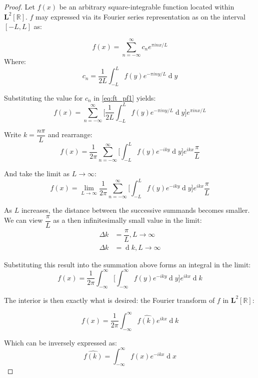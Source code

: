 \documentclass[12pt,a4paper]{report}
\DeclareMathOperator{\deriv}{d}
\theoremstyle{thms}
\theoremstyle{defns}
\begin{document}
\begin{proof}
    Let $f(x)$ be an arbitrary square-integrable function located within $\mathbf{L}^2[\mathbb{R}]$. $f$ may expressed via its Fourier series representation as on the interval $[-L, L]$ as:

    \begin{equation}
        f(x) = \sum_{n=-\infty}^{\infty} c_ne^{\pi inx/L}
        \label{eq:ft_pf1}
    \end{equation}
    Where:
    \begin{equation}
        c_n = \dfrac{1}{2L}\int_{-L}^{L} f(y)e^{-\pi iny/L}\deriv{y}
    \end{equation}

    Substituting the value for $c_n$ in \eqref{eq:ft_pf1} yields:
    \begin{equation}
        f(x) = \sum_{n=-\infty}^{\infty} \Big[\dfrac{1}{2L}\int_{-L}^{L} f(y)e^{-\pi iny/L}\deriv{y}\Big]e^{\pi inx/L}
    \end{equation}

    Write $k = \dfrac{n\pi}{L}$ and rearrange:
    \begin{equation}
        f(x) = \dfrac{1}{2\pi}\sum_{n=-\infty}^{\infty} \Big[\int_{-L}^{L} f(y)e^{-iky}\deriv{y}\Big]e^{ikx}\dfrac{\pi}{L}
    \end{equation}

    And take the limit as $L \to \infty$:
    \begin{equation}
        f(x) = \lim_{L\to\infty}\dfrac{1}{2\pi}\sum_{n=-\infty}^{\infty} \Big[\int_{-L}^{L} f(y)e^{-iky}\deriv{y}\Big]e^{ikx}\dfrac{\pi}{L}
    \end{equation}

    As $L$ increases, the distance between the successive summands becomes smaller. We can view $\dfrac{\pi}{L}$ as a then infinitesimally small value in the limit:
    \begin{align}
        \Delta k & = \dfrac{\pi}{L}, L \to \infty \\
        \Delta k & = \deriv{k}, L \to \infty
    \end{align}

    Substituting this result into the summation above forms an integral in the limit:
    \begin{equation}
        f(x) = \dfrac{1}{2\pi}\int_{-\infty}^{\infty} \Big[\int_{-\infty}^{\infty} f(y)e^{-iky}\deriv{y}\Big]e^{ikx}\deriv{k}
    \end{equation}

    The interior is then exactly what is desired: the Fourier transform of $f$ in $\mathbf{L}^2[\mathbb{R}]$:

    \begin{equation}
        f(x) = \dfrac{1}{2\pi}\int_{-\infty}^{\infty} \hat{f(k)}e^{ikx}\deriv{k}
    \end{equation}

    Which can be inversely expressed as:
    \begin{equation}
        \hat{f(k)} = \int_{-\infty}^{\infty} f(x)e^{-ikx}\deriv{x}
    \end{equation}
\end{proof}
\end{document}
